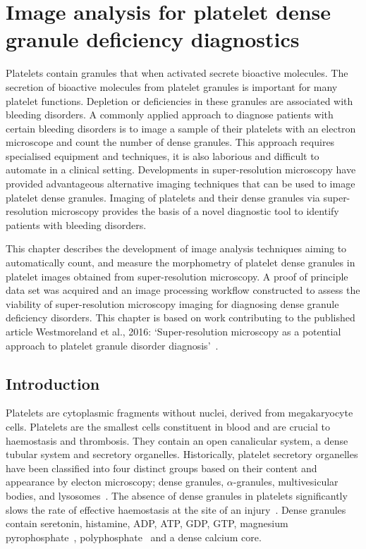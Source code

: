 \chapter{Image analysis for platelet dense granule deficiency diagnostics}
\label{platelets}
\ifpdf
    \graphicspath{{chapter_3/figs/}}
\fi


Platelets contain granules that when activated secrete bioactive molecules. The secretion of bioactive molecules from platelet granules is important for many platelet functions. Depletion or deficiencies in these granules are associated with bleeding disorders. A commonly applied approach to diagnose patients with certain bleeding disorders is to image a sample of their platelets with an electron microscope and count the number of dense granules. This approach requires specialised equipment and techniques, it is also laborious and difficult to automate in a clinical setting. Developments in super-resolution microscopy have provided advantageous alternative imaging techniques that can be used to image platelet dense granules. Imaging of platelets and their dense granules via super-resolution microscopy provides the basis of a novel diagnostic tool to identify patients with bleeding disorders.

This chapter describes the development of image analysis techniques aiming to automatically count, and measure the morphometry of platelet dense granules in platelet images obtained from super-resolution microscopy. A proof of principle data set was acquired and an image processing workflow constructed to assess the viability of super-resolution microscopy imaging for diagnosing dense granule deficiency disorders. This chapter is based on work contributing to the published article Westmoreland et al., 2016: `Super-resolution microscopy as a potential approach to platelet granule disorder diagnosis'~\cite{Westmoreland2016}.

\section{Introduction}
\label{platelets:introduction}
Platelets are cytoplasmic fragments without nuclei, derived from megakaryocyte cells. Platelets are the smallest cells constituent in blood and are crucial to haemostasis and thrombosis. They contain an open canalicular system, a dense tubular system and secretory organelles. Historically, platelet secretory organelles have been classified into four distinct groups based on their content and appearance by electon microscopy; dense granules, $\alpha$-granules, multivesicular bodies, and lysosomes~\cite{VanNispenTotPannerden2010}. The absence of dense granules in platelets significantly slows the rate of effective haemostasis at the site of an injury~\cite{Seward2013}. Dense granules contain seretonin, histamine, ADP, ATP, GDP, GTP, magnesium pyrophosphate~\cite{Rendu2001}, polyphosphate~\cite{Ruiz2004} and a dense calcium core.

